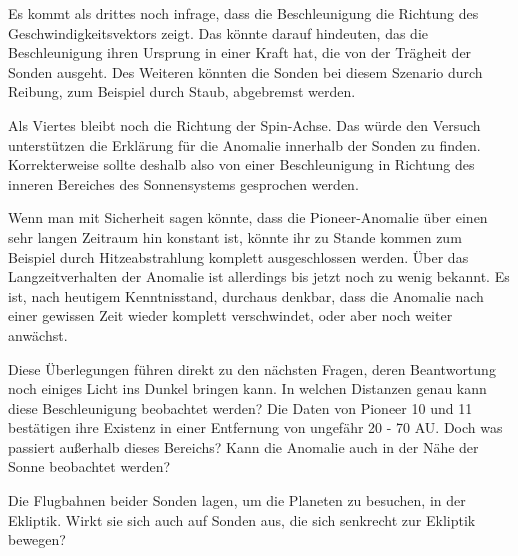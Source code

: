 Es kommt als drittes noch infrage, dass die Beschleunigung die Richtung des
Geschwindigkeitsvektors zeigt. Das k\"onnte darauf hindeuten, das die
Beschleunigung ihren Ursprung in einer Kraft hat, die von der
Tr\"agheit der Sonden ausgeht. Des Weiteren k\"onnten die Sonden bei
diesem Szenario durch Reibung, zum Beispiel durch Staub, abgebremst
werden.




Als Viertes bleibt noch die Richtung der Spin-Achse. Das w\"urde den
Versuch unterst\"utzen die Erkl\"arung f\"ur die Anomalie innerhalb der
Sonden zu finden. Korrekterweise sollte deshalb also von einer
Beschleunigung in Richtung des inneren Bereiches des Sonnensystems
gesprochen werden.




Wenn man mit Sicherheit sagen könnte, dass die Pioneer-Anomalie über einen
sehr langen Zeitraum hin konstant ist, könnte ihr zu Stande kommen zum
Beispiel durch Hitzeabstrahlung komplett ausgeschlossen werden.
\"Uber das Langzeitverhalten der Anomalie ist allerdings bis jetzt noch
zu wenig bekannt. Es ist, nach heutigem Kenntnisstand, durchaus
denkbar, dass die Anomalie nach einer gewissen Zeit wieder komplett
verschwindet, oder aber noch weiter anw\"achst.




Diese \"Uberlegungen f\"uhren direkt zu den n\"achsten Fragen, deren
Beantwortung noch einiges Licht ins Dunkel bringen kann. In welchen
Distanzen genau kann diese Beschleunigung beobachtet werden? Die Daten
von Pioneer 10 und 11 best\"atigen ihre Existenz in einer Entfernung
von ungef\"ahr 20 - 70 AU. Doch was passiert au{\ss}erhalb dieses
Bereichs? Kann die Anomalie auch in der N\"ahe der Sonne beobachtet
werden?

Die Flugbahnen beider Sonden lagen, um die Planeten zu besuchen, in der
Ekliptik. Wirkt sie sich auch auf Sonden aus, die sich senkrecht zur
Ekliptik bewegen?